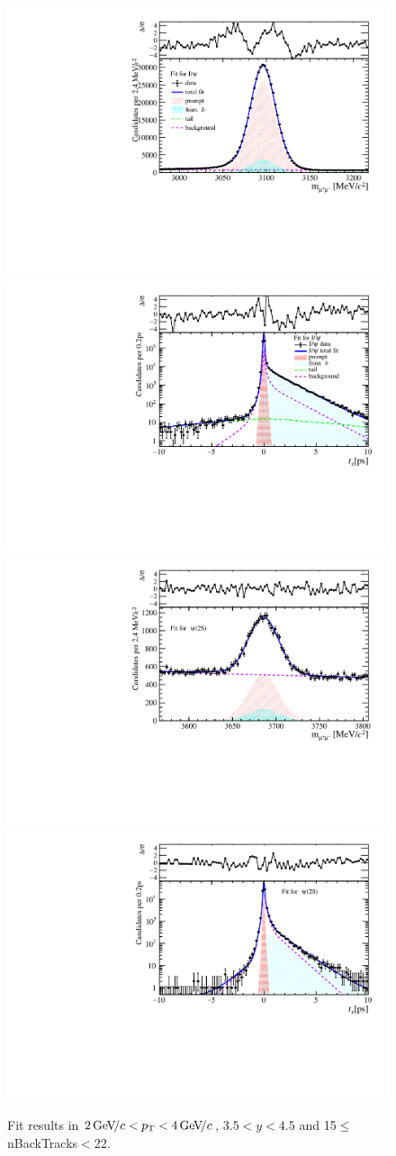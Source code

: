 \begin{figure}[H]
\begin{center}
\includegraphics[width=0.47\linewidth]{pdf/Jpsi/drawmassB/n3y3pt2.pdf}
\includegraphics[width=0.47\linewidth]{pdf/Jpsi/2DFitB/n3y3pt2.pdf}
\vspace*{-0.5cm}
\includegraphics[width=0.47\linewidth]{pdf/Psi2S/drawmassB/n3y3pt2.pdf}
\includegraphics[width=0.47\linewidth]{pdf/Psi2S/2DFitB/n3y3pt2.pdf}
\vspace*{-0.5cm}
\end{center}
\caption{Fit results in $2\text{\,Ge\kern -0.1em V\!/}c<p_{\mathrm{T}}<4\text{\,Ge\kern -0.1em V\!/}c$, $3.5<y<4.5$ and 15$\leq$nBackTracks$<$22.}
\label{Fitn3y3pt2}
\end{figure}
